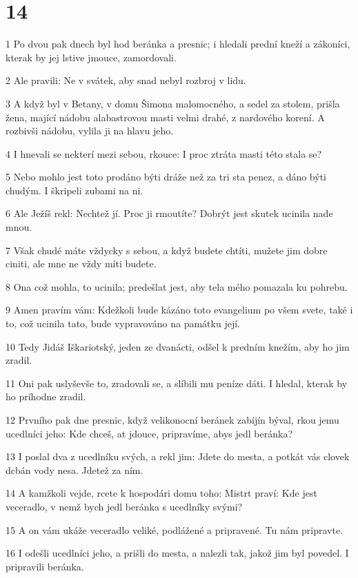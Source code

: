 \chapter{14}

\par 1 Po dvou pak dnech byl hod beránka a presnic; i hledali prední kneží a zákoníci, kterak by jej lstive jmouce, zamordovali.
\par 2 Ale pravili: Ne v svátek, aby snad nebyl rozbroj v lidu.
\par 3 A když byl v Betany, v domu Šimona malomocného, a sedel za stolem, prišla žena, mající nádobu alabastrovou masti velmi drahé, z nardového korení. A rozbivši nádobu, vylila ji na hlavu jeho.
\par 4 I hnevali se nekterí mezi sebou, rkouce: I proc ztráta masti této stala se?
\par 5 Nebo mohlo jest toto prodáno býti dráže než za tri sta penez, a dáno býti chudým. I škripeli zubami na ni.
\par 6 Ale Ježíš rekl: Nechtež jí. Proc ji rmoutíte? Dobrýt jest skutek ucinila nade mnou.
\par 7 Však chudé máte vždycky s sebou, a když budete chtíti, mužete jim dobre ciniti, ale mne ne vždy míti budete.
\par 8 Ona což mohla, to ucinila; predešlat jest, aby tela mého pomazala ku pohrebu.
\par 9 Amen pravím vám: Kdežkoli bude kázáno toto evangelium po všem svete, také i to, což ucinila tato, bude vypravováno na památku její.
\par 10 Tedy Jidáš Iškariotský, jeden ze dvanácti, odšel k predním knežím, aby ho jim zradil.
\par 11 Oni pak uslyševše to, zradovali se, a slíbili mu peníze dáti. I hledal, kterak by ho príhodne zradil.
\par 12 Prvního pak dne presnic, když velikonocní beránek zabíjín býval, rkou jemu ucedlníci jeho: Kde chceš, at jdouce, pripravíme, abys jedl beránka?
\par 13 I poslal dva z ucedlníku svých, a rekl jim: Jdete do mesta, a potkát vás clovek dcbán vody nesa. Jdetež za ním.
\par 14 A kamžkoli vejde, rcete k hospodári domu toho: Mistrt praví: Kde jest veceradlo, v nemž bych jedl beránka s ucedlníky svými?
\par 15 A on vám ukáže veceradlo veliké, podlážené a pripravené. Tu nám pripravte.
\par 16 I odešli ucedlníci jeho, a prišli do mesta, a nalezli tak, jakož jim byl povedel. I pripravili beránka.
